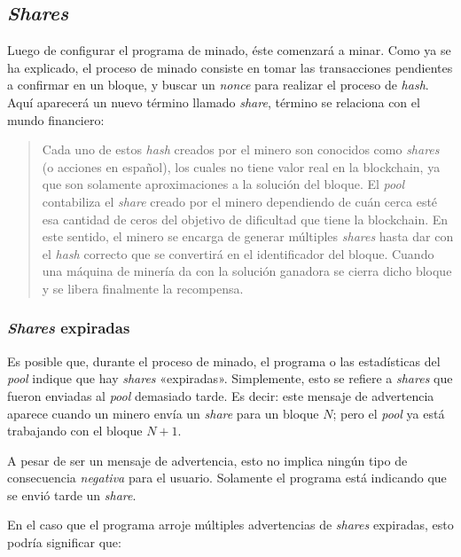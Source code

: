 \documentclass[12pt,a4paper,twoside]{book}
\begin{document}
\subsection{\textit{Shares}}
Luego de configurar el programa de minado, éste comenzará a minar. Como ya se ha explicado, el proceso de minado consiste en tomar las transacciones pendientes a confirmar en un bloque, y buscar un \textit{nonce} para realizar el proceso de \textit{hash}. Aquí aparecerá un nuevo término llamado \textit{share}, término se relaciona con el mundo financiero:

\begin{quotation}
Cada uno de estos \textit{hash} creados por el minero son conocidos como \textit{shares} (o acciones en español), los cuales no tiene valor real en la blockchain, ya que son solamente aproximaciones a la solución del bloque. El \textit{pool} contabiliza el \textit{share} creado por el minero dependiendo de cuán cerca esté esa cantidad de ceros del objetivo de dificultad que tiene la blockchain. En este sentido, el minero se encarga de generar múltiples \textit{shares} hasta dar con el \textit{hash} correcto que se convertirá en el identificador del bloque. Cuando una máquina de minería da con la solución ganadora se cierra dicho bloque y se libera finalmente la recompensa. \cite{shares}
\end{quotation}

\subsubsection{\textit{Shares} expiradas}
Es posible que, durante el proceso de minado, el programa o las estadísticas del \textit{pool} indique que hay \textit{shares} «expiradas». Simplemente, esto se refiere a  \textit{shares} que fueron enviadas al \textit{pool} demasiado tarde. Es decir: este mensaje de advertencia aparece cuando un minero envía un \textit{share} para un bloque $ N $; pero el \textit{pool} ya está trabajando con el bloque $ N + 1$.

A pesar de ser un mensaje de advertencia, esto no implica ningún tipo de consecuencia \textit{negativa} para el usuario. Solamente el programa está indicando que se envió tarde un \textit{share}.

En el caso que el programa arroje múltiples advertencias de \textit{shares} expiradas, esto podría significar que:
\end{document}
